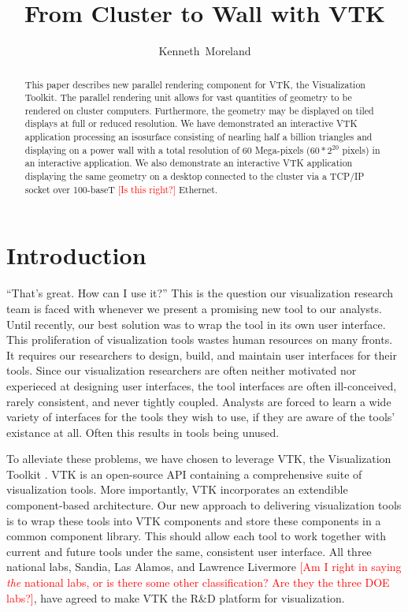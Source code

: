 \documentclass[twocolumn]{article}
\title{From Cluster to Wall with VTK}
\author{Kenneth~Moreland}
\newcommand{\sticky}[1]{\textcolor{Red}{[#1]}}
\begin{document}
\maketitle

\begin{abstract}
  This paper describes new parallel rendering component for VTK, the
  Visualization Toolkit.  The parallel rendering unit allows for vast
  quantities of geometry to be rendered on cluster computers.  Furthermore,
  the geometry may be displayed on tiled displays at full or reduced
  resolution.  We have demonstrated an interactive VTK application
  processing an isosurface consisting of nearling half a billion triangles
  and displaying on a power wall with a total resolution of 60 Mega-pixels
  ($60*2^{20}$ pixels) in an interactive application.  We also demonstrate
  an interactive VTK application displaying the same geometry on a desktop
  connected to the cluster via a TCP/IP socket over 100-baseT \sticky{Is
  this right?} Ethernet.
\end{abstract}

\section{Introduction}
\label{sec:introduction}

``That's great.  How can I use it?''  This is the question our
visualization research team is faced with whenever we present a promising
new tool to our analysts.  Until recently, our best solution was to wrap
the tool in its own user interface.  This proliferation of visualization
tools wastes human resources on many fronts.  It requires our researchers
to design, build, and maintain user interfaces for their tools.  Since our
visualization researchers are often neither motivated nor experieced at
designing user interfaces, the tool interfaces are often ill-conceived,
rarely consistent, and never tightly coupled.  Analysts are forced to learn
a wide variety of interfaces for the tools they wish to use, if they are
aware of the tools' existance at all.  Often this results in tools being
unused.

To alleviate these problems, we have chosen to leverage VTK, the
Visualization Toolkit \cite{Schroeder98}.  VTK is an open-source API
containing a comprehensive suite of visualization tools.  More importantly,
VTK incorporates an extendible component-based architecture.  Our new
approach to delivering visualization tools is to wrap these tools into VTK
components and store these components in a common component library.  This
should allow each tool to work together with current and future tools under
the same, consistent user interface.  All three national labs, Sandia, Las
Alamos, and Lawrence Livermore \sticky{Am I right in saying \emph{the}
national labs, or is there some other classification?  Are they the three
DOE labs?}, have agreed to make VTK the R\&D platform for visualization.
\end{document}
